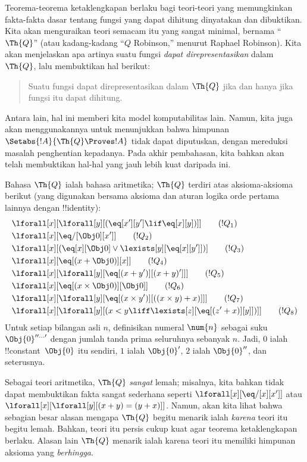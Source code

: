 \documentclass[../../../include/open-logic-section]{subfiles}
\begin{document}

Teorema-teorema ketaklengkapan berlaku bagi teori-teori yang memungkinkan
fakta-fakta dasar tentang fungsi yang dapat dihitung dinyatakan dan
dibuktikan. Kita akan menguraikan teori semacam itu yang sangat minimal,
bernama ``$\Th{Q}$'' (atau kadang-kadang ``$Q$ Robinson,'' menurut Raphael
Robinson). Kita akan menjelaskan apa artinya suatu fungsi
\emph{dapat direpresentasikan} dalam $\Th{Q}$, lalu membuktikan hal berikut:
\begin{quote}
  Suatu fungsi dapat direpresentasikan dalam $\Th{Q}$ jika dan hanya jika
  fungsi itu dapat dihitung.
\end{quote}
Antara lain, hal ini memberi kita model komputabilitas lain. Namun, kita juga
akan menggunakannya untuk menunjukkan bahwa himpunan
$\Setabs{!A}{\Th{Q} \Proves !A}$ tidak dapat diputuskan, dengan mereduksi
masalah penghentian kepadanya. Pada akhir pembahasan, kita bahkan akan telah
membuktikan hal-hal yang jauh lebih kuat daripada ini.

Bahasa $\Th{Q}$ ialah bahasa aritmetika; $\Th{Q}$ terdiri atas
aksioma-aksioma berikut (yang digunakan bersama aksioma dan aturan logika orde
pertama lainnya dengan !!{identity}):
\begin{align*}
& \lforall[x][\lforall[y][(\eq[x'][y'] \lif \eq[x][y])]] \tag{$!Q_1$}\\
& \lforall[x][\eq/[\Obj 0][x']] \tag{$!Q_2$}\\
& \lforall[x][(\eq[x][\Obj 0] \lor \lexists[y][\eq[x][y']])] \tag{$!Q_3$}\\
& \lforall[x][\eq[(x + \Obj 0)][x]] \tag{$!Q_4$}\\
& \lforall[x][\lforall[y][\eq[(x + y')][(x + y)']]] \tag{$!Q_5$}\\
& \lforall[x][\eq[(x \times \Obj 0)][\Obj 0]] \tag{$!Q_6$}\\
& \lforall[x][\lforall[y][\eq[(x \times y')][((x \times y) + x)]]] \tag{$!Q_7$}\\
& \lforall[x][\lforall[y][(x < y \liff \lexists[z][\eq[(z' + x)][y]])]] \tag{$!Q_8$}
\end{align*}
Untuk setiap bilangan asli $n$, definisikan numeral $\num{n}$ sebagai suku
$\Obj{0}^{\prime\prime\ldots\prime}$ dengan jumlah tanda prima seluruhnya
sebanyak $n$. Jadi, $\num{0}$ ialah !!{constant}~$\Obj{0}$ itu sendiri,
$\num{1}$ ialah $\Obj{0}'$, $\num{2}$ ialah $\Obj{0}''$, dan seterusnya.

Sebagai teori aritmetika, $\Th{Q}$ \emph{sangat} lemah; misalnya, kita bahkan
tidak dapat membuktikan fakta sangat sederhana seperti
$\lforall[x][\eq/[x][x']]$ atau $\lforall[x][\lforall[y][(x + y) = (y +
    x)]]$. Namun, akan kita lihat bahwa sebagian besar alasan mengapa
$\Th{Q}$ begitu menarik ialah \emph{karena} teori itu begitu lemah. Bahkan,
teori itu persis cukup kuat agar teorema ketaklengkapan berlaku. Alasan lain
$\Th{Q}$ menarik ialah karena teori itu memiliki himpunan aksioma yang
\emph{berhingga}.
\end{document}

